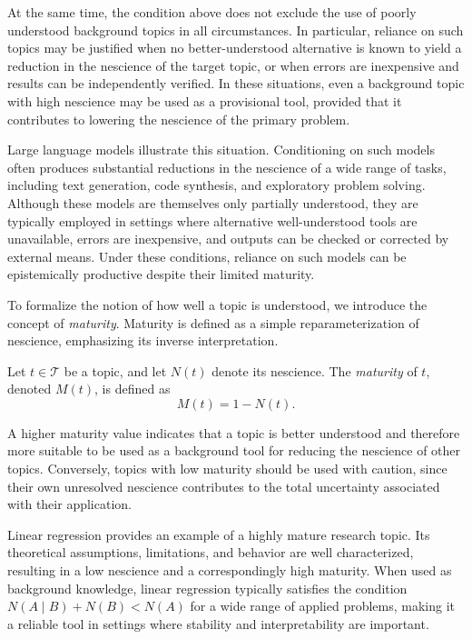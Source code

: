 At the same time, the condition above does not exclude the use of poorly understood background topics in all circumstances. In particular, reliance on such topics may be justified when no better-understood alternative is known to yield a reduction in the nescience of the target topic, or when errors are inexpensive and results can be independently verified. In these situations, even a background topic with high nescience may be used as a provisional tool, provided that it contributes to lowering the nescience of the primary problem.

\begin{example}
\label{ex:llm_maturity}
Large language models illustrate this situation. Conditioning on such models often produces substantial reductions in the nescience of a wide range of tasks, including text generation, code synthesis, and exploratory problem solving. Although these models are themselves only partially understood, they are typically employed in settings where alternative well-understood tools are unavailable, errors are inexpensive, and outputs can be checked or corrected by external means. Under these conditions, reliance on such models can be epistemically productive despite their limited maturity.
\end{example}

To formalize the notion of how well a topic is understood, we introduce the concept of \emph{maturity}. Maturity is defined as a simple reparameterization of nescience, emphasizing its inverse interpretation.

\begin{definition}
\label{def:maturity}
Let $t \in \mathcal{T}$ be a topic, and let $N(t)$ denote its nescience.
The \emph{maturity} of $t$, denoted $M(t)$, is defined as
\[
M(t) = 1 - N(t).
\]
\end{definition}

A higher maturity value indicates that a topic is better understood and therefore more suitable to be used as a background tool for reducing the nescience of other topics. Conversely, topics with low maturity should be used with caution, since their own unresolved nescience contributes to the total uncertainty associated with their application.

\begin{example}
\label{ex:linear_regression_maturity}
Linear regression provides an example of a highly mature research topic. Its theoretical assumptions, limitations, and behavior are well characterized, resulting in a low nescience and a correspondingly high maturity. When used as background knowledge, linear regression typically satisfies the condition $N(A \mid B) + N(B) < N(A)$ for a wide range of applied problems, making it a reliable tool in settings where stability and interpretability are important.
\end{example}

